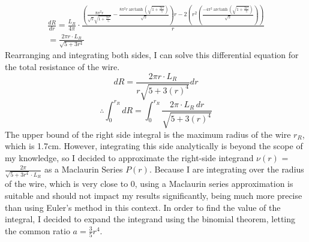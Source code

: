 \documentclass[12pt]{article}
\numberwithin{equation}{section}
\DeclareMathOperator\arctanh{arctanh}
\begin{document}
\begin{gather*}
\frac{dR}{dr} = \frac{L_R}{4\pi} \cdot \frac{\left( \frac{8 \pi^2 r}{\sqrt{5} \sqrt{1 + \frac{3 r^4}{5}}} - \frac{8 \pi^2 r \arctanh{\left(\sqrt{1 + \frac{3 r^4}{5}}\right)}}{\sqrt{5}} \right) r - 2 \left( r^2 \left( \frac{-4 \pi^2 \arctanh{\left(\sqrt{1 + \frac{3 r^4}{5}}\right)}}{\sqrt{5}} \right) \right)}{r} \\
= \frac{2 \pi r \cdot L_R}{\sqrt{5 + 3r^4}}
\end{gather*}
\noindent Rearranging and integrating both sides, I can solve this differential equation for the total resistance of the wire.
$$  {dR} =  \frac{2\pi r \cdot L_R }{r \sqrt{5+3(r)^4} } dr$$
\begin{equation}\label{eq:resistivityintegral}
    \therefore \int_{0}^{r_R} {dR} =  \int_{0}^{r_R} \frac{2\pi \cdot L_R \, dr}{\sqrt{5+3(r)^4}} 
\end{equation}
The upper bound of the right side integral is the maximum radius of the wire $r_R$, which is 1.7cm. However, integrating this side analytically is beyond the scope of my knowledge, so I decided to approximate the right-side integrand $\nu(r)$ = $\frac{2\pi}{\sqrt{5+3r^4}\cdot L_R}$ as a Maclaurin Series $P(r)$. Because I are integrating over the radius of the wire, which is very close to 0, using a Maclaurin series approximation is suitable and should not impact my results significantly, being much more precise than using Euler's method in this context. In order to find the value of the integral, I decided to expand the integrand using the binomial theorem, letting the common ratio $a = \frac{3}{5}r^4$.
\end{document}
